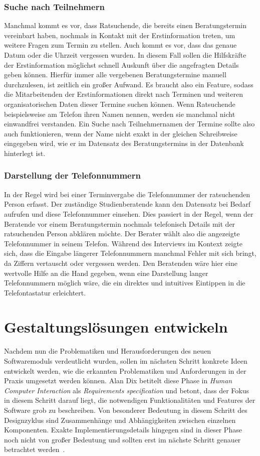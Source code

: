 \subsubsection{Suche nach Teilnehmern}
Manchmal kommt es vor, dass Ratsuchende, die bereits einen Beratungstermin
vereinbart haben, nochmals in Kontakt mit der Erstinformation treten, um
weitere Fragen zum Termin zu stellen. Auch kommt es vor, dass das genaue Datum
oder die Uhrzeit vergessen wurden. In diesem Fall sollen die Hilfskräfte der
Erstinformation möglichst schnell Auskunft über die angefragten Details geben
können. Hierfür immer alle vergebenen Beratungstermine manuell durchzulesen,
ist zeitlich ein großer Aufwand. Es braucht also ein Feature, sodass die
Mitarbeitenden der Erstinformationen direkt nach Terminen und weiteren
organisatorischen Daten dieser Termine suchen können. Wenn Ratsuchende
beispielsweise am Telefon ihren Namen nennen, werden sie manchmal nicht
einwandfrei verstanden. Ein Suche nach Teilnehmernamen der Termine sollte also
auch funktionieren, wenn der Name nicht exakt in der gleichen Schreibweise
eingegeben wird, wie er im Datensatz des Beratungstermins in der Datenbank
hinterlegt ist.

\subsubsection{Darstellung der Telefonnummern}
In der Regel wird bei einer Terminvergabe die Telefonnummer der ratsuchenden
Person erfasst. Der zuständige Studienberatende kann den Datensatz bei Bedarf
aufrufen und diese Telefonnummer einsehen. Dies passiert in der Regel, wenn der
Beratende vor einem Beratungstermin nochmals telefonisch Details mit der
ratsuchenden Person abklären möchte. Der Berater wählt also die angezeigte
Telefonnummer in seinem Telefon. Während des Interviews im Kontext zeigte sich,
dass die Eingabe längerer Telefonnummern manchmal Fehler mit sich bringt, da
Ziffern vertauscht oder vergessen werden. Den Beratenden wäre hier eine
wertvolle Hilfe an die Hand gegeben, wenn eine Darstellung langer
Telefonnummern möglich wäre, die ein direktes und intuitives Eintippen in die
Telefontastatur erleichtert.

\section{Gestaltungslösungen entwickeln}

Nachdem nun die Problematiken und Herausforderungen des neuen Softwaremoduls
verdeutlicht wurden, sollen im nächsten Schritt konkrete Ideen entwickelt
werden, wie die erkannten Problematiken und Anforderungen in der Praxis
umgesetzt werden können. Alan Dix betitelt diese Phase in \textit{Human
    Computer Interaction} als \textit{Requirements specification} und betont, dass
der Fokus in diesem Schritt darauf liegt, die notwendigen Funktionalitäten und
Features der Software grob zu beschreiben. Von besonderer Bedeutung in diesem
Schritt des Designzyklus sind Zusammenhänge und Abhängigkeiten zwischen
einzelnen Komponenten. Exakte Implementierungsdetails hingegen sind in dieser
Phase noch nicht von großer Bedeutung und sollten erst im nächste Schritt
genauer betrachtet werden~\cite{hci}.

